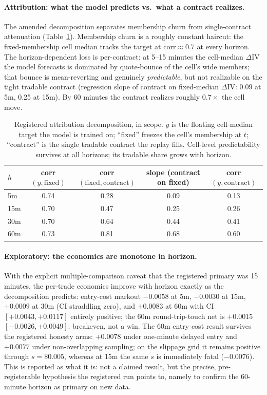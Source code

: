 \documentclass[11pt]{article}
\newcommand{\dIV}{\Delta\mathrm{IV}}
\begin{document}
\paragraph{Attribution: what the model predicts vs.\ what a contract
realizes.} The amended decomposition separates membership churn from
single-contract attenuation
(Table~\ref{tab:attribution}). Membership churn is a roughly constant
haircut: the fixed-membership cell median tracks the target at
corr${}\approx 0.7$ at every horizon. The horizon-dependent loss is
per-contract: at 5--15 minutes the cell-median $\dIV$ the model forecasts
is dominated by quote-bounce of the cell's wide members; that bounce is
mean-reverting and genuinely \emph{predictable}, but not realizable on the tight tradable
contract (regression slope of contract on fixed-median $\dIV$: 0.09 at 5m,
0.25 at 15m). By 60 minutes the contract realizes roughly $0.7\times$ the
cell move.

\begin{table}[h]
\centering
\begin{tabular}{lcccc}
\toprule
$h$ & corr$(y, \text{fixed})$ & corr$(\text{fixed}, \text{contract})$
  & slope (contract on fixed) & corr$(y, \text{contract})$ \\
\midrule
5m  & 0.74 & 0.28 & 0.09 & 0.13 \\
15m & 0.70 & 0.47 & 0.25 & 0.26 \\
30m & 0.70 & 0.64 & 0.44 & 0.41 \\
60m & 0.73 & 0.81 & 0.68 & 0.60 \\
\bottomrule
\end{tabular}
\caption{Registered attribution decomposition, in scope. $y$ is the
floating cell-median target the model is trained on; ``fixed'' freezes the
cell's membership at $t$; ``contract'' is the single tradable contract the
replay fills. Cell-level predictability survives at all horizons; its
tradable share grows with horizon.}
\label{tab:attribution}
\end{table}

\paragraph{Exploratory: the economics are monotone in horizon.}
\begin{sloppypar}
With the
explicit multiple-comparison caveat that the registered primary was 15
minutes, the per-trade economics improve with horizon exactly as the
decomposition predicts: entry-cost markout $-0.0058$ at 5m, $-0.0030$ at
15m, $+0.0009$ at 30m (CI straddling zero), and $\mathbf{+0.0083}$ at 60m
with CI $[+0.0043, +0.0117]$ entirely positive;
the 60m round-trip-touch net is $+0.0015$ $[-0.0026, +0.0049]$: breakeven, not a win. The 60m entry-cost result survives the registered
honesty arms: $+0.0078$ under one-minute delayed entry and $+0.0077$ under
non-overlapping sampling; on the slippage grid it remains positive through
$s = \$0.005$, whereas at 15m the same $s$ is immediately fatal
($-0.0076$). This is reported as what it is: not a claimed result, but the
precise, pre-registerable hypothesis the registered run points to, namely
to confirm the 60-minute horizon as primary on new data.
\end{sloppypar}
\end{document}
